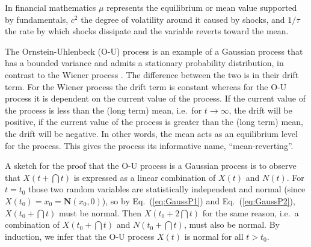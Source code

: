 \documentclass[10pt,a4paper]{article}
\newcommand{\eq}[1]{Eq.~(\ref{#1})}
\newcommand{\gaussian}{\ensuremath{\mathbf{N}}}
\newcommand{\OU}{\renewcommand{\OU}{O-U\xspace}Ornstein-Uhlenbeck (O-U)\xspace}
\begin{document}
In financial mathematics $\mu$ represents the
equilibrium or mean value supported by fundamentals, $c^2$ the degree of
volatility around it caused by shocks, and $1/\tau$ the rate by which shocks
dissipate and the variable reverts toward the mean.

The \OU process is an example of a Gaussian process that has a bounded
variance and admits a stationary probability distribution, in contrast to
the Wiener process \citep{gillespie:1996a}. 
The difference between the two is in their drift term.
For the Wiener process the drift term is constant whereas for the \OU
process it is dependent on the current value of the process. If the current
value of the process is less than the (long term) mean, i.e.\ for
$t\rightarrow\infty$, the drift will be positive, if the current value of the 
process is greater than the (long term) mean, the drift will be negative. 
In other words, the mean acts as an
equilibrium level for the process. This gives the process its informative
name, ``mean-reverting''.

A sketch for the proof that the \OU process is a Gaussian process is to
observe that $X(t{+}\dint{t})$ is expressed as a linear combination of $X(t)$
and $N(t)$. For $t=t_0$ those two random variables are statistically
independent and normal (since $X(t_0)=x_0=\gaussian(x_0,0)$), so by
\eq{eq:GaussP1} and \eq{eq:GaussP2}, $X(t_0{+}\dint{t})$ must be normal.
Then $X(t_0{+}2\dint{t})$ for the same reason, i.e.\ a combination of
$X(t_0{+}\dint{t})$ and $N(t_0{+}\dint{t})$, must also  be normal. By
induction, we infer that the \OU process $X(t)$ is normal for all $t>t_0$.
\end{document}
